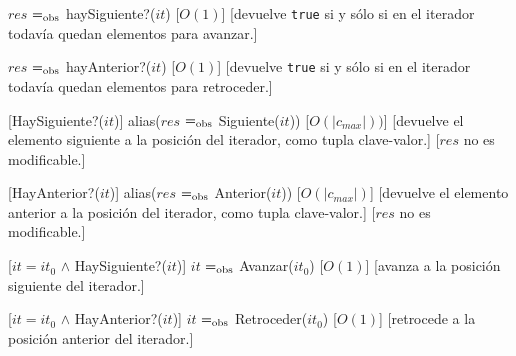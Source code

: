 \begin{Interfaz}
	{$res$ $=_{\mathrm{obs}}$ haySiguiente?($it$)}
	[$O(1)$]
	[devuelve \texttt{true} si y sólo si en el iterador todavía quedan elementos para avanzar.]

	{$res$ $=_{\mathrm{obs}}$ hayAnterior?($it$)}
	[$O(1)$]
	[devuelve \texttt{true} si y sólo si en el iterador todavía quedan elementos para retroceder.]

	[HaySiguiente?($it$)]
	{alias($res$ $=_{\mathrm{obs}}$ Siguiente($it$))}
	[$O(|c_{max}|))$]
	[devuelve el elemento siguiente a la posición del iterador, como tupla clave-valor.]
	[$res$ no es modificable.]

	[HayAnterior?($it$)]
	{alias($res$ $=_{\mathrm{obs}}$ Anterior($it$))}
	[$O(|c_{max}|)$]
	[devuelve el elemento anterior a la posición del iterador, como tupla clave-valor.]
	[$res$ no es modificable.]

	[$it = it_0$ $\land$ HaySiguiente?($it$)]
	{$it$ $=_{\mathrm{obs}}$ Avanzar($it_0$)}
	[$O(1)$]
	[avanza a la posición siguiente del iterador.]

	[$it = it_0$ $\land$ HayAnterior?($it$)]
	{$it$ $=_{\mathrm{obs}}$ Retroceder($it_0$)}
	[$O(1)$]
	[retrocede a la posición anterior del iterador.]

\end{Interfaz}

